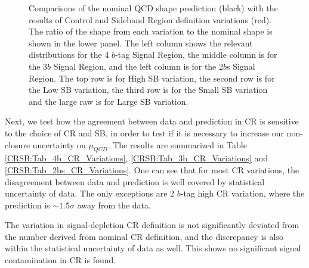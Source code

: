 \begin{figure}[htbp!]
\begin{center}
\end{center}
\caption{Comparisons of the nominal QCD shape prediction (black) with the results of Control and Sideband Region definition variations (red). The ratio of the shape from each variation to the nominal shape is shown in the lower panel. The left column shows the relevant distributions for the 4 $b$-tag Signal Region, the middle column is for the 3$b$ Signal Region, and the left column is for the 2$b$s Signal Region. The top row is for High SB variation, the second row is for the Low SB variation, the third row is for the Small SB variation and the large raw is for Large SB variation.}
\label{CRSB:QCDShapeSR-SB}
\end{figure}

\clearpage
Next, we test how the agreement between data and prediction in CR is sensitive to the choice of CR and SB, in order to test if it is necessary to increase our non-closure uncertainty on $\mu_{QCD}$. The results are summarized in Table \ref{CRSB:Tab_4b_CR_Variations}, \ref{CRSB:Tab_3b_CR_Variations} and \ref{CRSB:Tab_2bs_CR_Variations}. One can see that for most CR variations, the disagreement between data and prediction is well covered by statistical uncertainty of data. The only exceptions are 2 $b$-tag high CR variation, where the prediction is $\sim 1.5 \sigma$ away from the data. 

The variation in signal-depletion CR definition is not significantly deviated from the number derived from nominal CR definition, and the discrepancy is also within the statistical uncertainty of data as well. This shows no significant signal contamination in CR is found.


\clearpage
